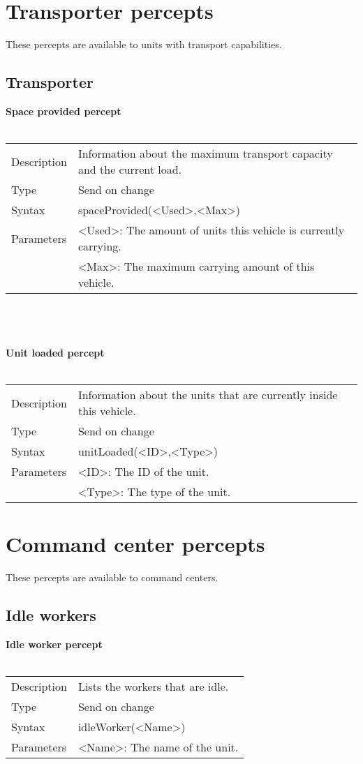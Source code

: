 \documentclass[english,11pt]{report}
\begin{document}
\newpage
\section{Transporter percepts}
These percepts are available to units with transport capabilities.
\subsection{Transporter}
\textbf{Space provided percept}\\
\\
\begin{tabularx}{\textwidth}{lX}
 Description & Information about the maximum transport capacity and the current load. \\
 Type & Send on change \\
 Syntax & spaceProvided(<Used>,<Max>) \\
 Parameters &   <Used>: The amount of units this vehicle is currently carrying.\\
            &   <Max>: The maximum carrying amount of this vehicle.
\end{tabularx}\\
\\
\\
\textbf{Unit loaded percept}\\
\\
\begin{tabularx}{\textwidth}{lX}
 Description & Information about the units that are currently inside this vehicle. \\
 Type & Send on change \\
 Syntax & unitLoaded(<ID>,<Type>) \\
 Parameters &   <ID>: The ID of the unit.\\
            &   <Type>: The type of the unit.
\end{tabularx}

\newpage
\section{Command center percepts}
These percepts are available to command centers.
\subsection{Idle workers}
\textbf{Idle worker percept}\\
\\
\begin{tabularx}{\textwidth}{lX}
 Description & Lists the workers that are idle. \\
 Type & Send on change \\
 Syntax & idleWorker(<Name>) \\
 Parameters &   <Name>: The name of the unit.
\end{tabularx}
\end{document}
